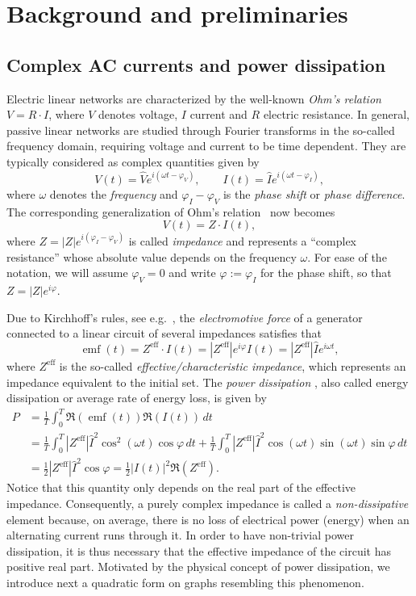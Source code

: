 \documentclass[11pt]{amsart}
\theoremstyle{definition}
\theoremstyle{remark}
\theoremstyle{example}
\numberwithin{equation}{section}
\begin{document}
\section{Background and preliminaries}\label{section background}

\subsection{Complex AC currents and power dissipation}
Electric linear networks are characterized by the well-known \textit{Ohm's relation} $V=R\cdot I$, where $V$ denotes voltage, $I$ current and $R$ electric resistance. In general, passive linear networks are studied through Fourier transforms in the so-called frequency domain, requiring voltage and current to be time dependent. They are typically considered as complex quantities given by
\[
V(t)=\hat{V}e^{i(\omega t-\varphi_V)},\qquad I(t)=\hat{I}e^{i(\omega t-\varphi_I)},
\]
where $\omega$ denotes the \textit{frequency} and $\varphi_I-\varphi_V$ is the \textit{phase shift} or \textit{phase difference}. The corresponding generalization of Ohm's relation~\cite{Bru31} now becomes
\begin{equation}\label{eq ohms law}
V(t)=Z\cdot I(t),
\end{equation}
where $Z=|Z|e^{i(\varphi_I-\varphi_V)}$ is called \textit{impedance} and represents a ``complex resistance'' whose absolute value depends on the frequency $\omega$. For ease of the notation, we will assume $\varphi_V=0$ and write $\varphi:=\varphi_I$ for the phase shift, so that $Z=|Z|e^{i\varphi}$.

\medskip

Due to Kirchhoff's rules, see e.g.~\cite[Section 22.4]{FLS64}, the \textit{electromotive force} of a generator connected to a linear circuit of several impedances satisfies that 
\[
{\operatorname{emf}}(t)=Z^{\text{eff}}\cdot I(t)=|Z^{\text{eff}}|e^{i\varphi}I(t)=|Z^{\text{eff}}|\hat{I}e^{i\omega t},
\]
where $Z^{\text{eff}}$ is the so-called \textit{effective/characteristic impedance}, which represents an im\-pe\-dance equivalent to the initial set. 
The \textit{power dissipation}
, also called energy dissipation or average rate of energy loss, is given by
\begin{align*}
P&=\frac{1}{T}\int_0^T\Re({\operatorname{emf}}(t))\Re(I(t))\,dt\\
&=\frac{1}{T}\int_0^T|Z^{\text{eff}}|\hat{I}^2\cos^2(\omega t)\cos\varphi\,dt+\frac{1}{T}\int_0^T|Z^{\text{eff}}|\hat{I}^2\cos(\omega t)\sin(\omega t)\sin\varphi\,dt\\
&=\frac{1}{2}|Z^{\text{eff}}|\hat{I}^2\cos\varphi=\frac{1}{2}|I(t)|^2\Re(Z^{\text{eff}}).
\end{align*}
Notice that this quantity only depends on the real part of the effective impedance. Consequently, a purely complex impedance is called a \textit{non-dissipative} element because, on average, there is no loss of electrical power (energy) when an alternating current runs through it.  
In order to have non-trivial power dissipation, 
it is thus necessary that the effective impedance of the circuit has positive real part. Motivated by the physical concept of power dissipation, we introduce next a quadratic form on graphs resembling this phenomenon.
\end{document}
